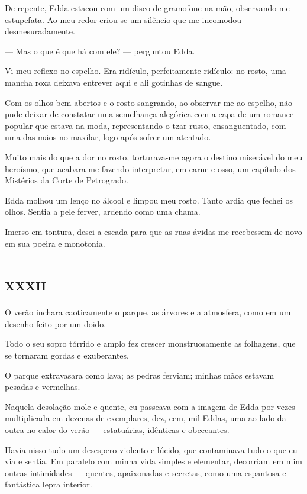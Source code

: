 De repente, Edda estacou com um disco de gramofone na mão, observando-me estupefata. Ao meu redor criou-se um silêncio que me incomodou desmesuradamente. 

--- Mas o que é que há com ele? --- perguntou Edda. 

Vi meu reflexo no espelho. Era ridículo, perfeitamente ridículo: no rosto, uma mancha roxa deixava entrever aqui e ali gotinhas de sangue.

Com os olhos bem abertos e o rosto sangrando, ao observar-me ao espelho, não pude deixar de constatar uma semelhança alegórica com a capa de um romance popular que estava na moda, representando o tzar russo, ensanguentado, com uma das mãos no maxilar, logo após sofrer um atentado.

Muito mais do que a dor no rosto, torturava-me agora o destino miserável do meu heroísmo, que acabara me fazendo interpretar, em carne e osso, um capítulo dos Mistérios da Corte de Petrogrado. 

Edda molhou um lenço no álcool e limpou meu rosto. Tanto ardia que fechei os olhos. Sentia a pele ferver, ardendo como uma chama.

Imerso em tontura, desci a escada para que as ruas ávidas me recebessem de novo em sua poeira e monotonia.


\chapter*{\huge\centering\textsc{xxxii}}

O verão inchara caoticamente o parque, as árvores e a atmosfera, como em um desenho feito por um doido.

Todo o seu sopro tórrido e amplo fez crescer monstruosamente as folhagens, que se tornaram gordas e exuberantes.

O parque extravasara como lava; as pedras ferviam; minhas mãos estavam pesadas e vermelhas.

Naquela desolação mole e quente, eu passeava com a imagem de Edda por vezes multiplicada em dezenas de exemplares, dez, cem, mil Eddas, uma ao lado da outra no calor do verão --- estatuárias, idênticas e obcecantes.

Havia nisso tudo um desespero violento e lúcido, que contaminava tudo o que eu via e sentia. Em paralelo com minha vida simples e elementar, decorriam em mim outras intimidades --- quentes, apaixonadas e secretas, como uma espantosa e fantástica lepra interior.

